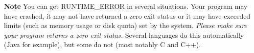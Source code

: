 \documentclass[a4paper]{artikel3}
\newcommand{\strong}[1]{\textbf{#1}}
\begin{document}
\strong{Note} You can get RUNTIME\_ERROR in several situations. Your program
may have crashed, it may not have returned a zero exit status or it may have
exceeded limits (such as memory usage or disk quota) set by the system.
\emph{Please make sure your program returns a zero exit status.} Several
languages do this automatically (Java for example), but some
do not (most notably C and C++).
\end{document}
